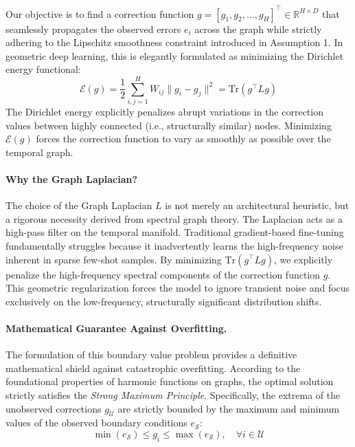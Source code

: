 \documentclass{article}
\begin{document}
Our objective is to find a correction function $g = [g_1, g_2, \dots, g_H]^\top \in \mathbb{R}^{H \times D}$ that seamlessly propagates the observed errors $e_i$ across the graph while strictly adhering to the Lipschitz smoothness constraint introduced in Assumption 1. In geometric deep learning, this is elegantly formulated as minimizing the Dirichlet energy functional:
\begin{equation}
    \mathcal{E}(g) = \frac{1}{2} \sum_{i,j=1}^{H} W_{ij} \|g_i - g_j\|^2 = \text{Tr}(g^\top L g)
\end{equation}
The Dirichlet energy explicitly penalizes abrupt variations in the correction values between highly connected (i.e., structurally similar) nodes. Minimizing $\mathcal{E}(g)$ forces the correction function to vary as smoothly as possible over the temporal graph.

\paragraph{Why the Graph Laplacian?} The choice of the Graph Laplacian $L$ is not merely an architectural heuristic, but a rigorous necessity derived from spectral graph theory. The Laplacian acts as a high-pass filter on the temporal manifold. Traditional gradient-based fine-tuning fundamentally struggles because it inadvertently learns the high-frequency noise inherent in sparse few-shot samples. By minimizing $\text{Tr}(g^\top L g)$, we explicitly penalize the high-frequency spectral components of the correction function $g$. This geometric regularization forces the model to ignore transient noise and focus exclusively on the low-frequency, structurally significant distribution shifts.

\paragraph{Mathematical Guarantee Against Overfitting.} The formulation of this boundary value problem provides a definitive mathematical shield against catastrophic overfitting. According to the foundational properties of harmonic functions on graphs, the optimal solution strictly satisfies the \textit{Strong Maximum Principle}. Specifically, the extrema of the unobserved corrections $g_{\mathcal{U}}$ are strictly bounded by the maximum and minimum values of the observed boundary conditions $e_{\mathcal{S}}$:
\begin{equation}
    \min(e_{\mathcal{S}}) \leq g_i \leq \max(e_{\mathcal{S}}), \quad \forall i \in \mathcal{U}
\end{equation}
\end{document}

